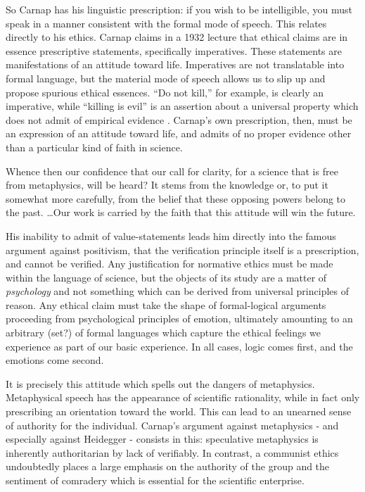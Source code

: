 \documentclass[leqno, 12pt]{turabian-researchpaper}
\begin{document}
	So Carnap has his linguistic prescription: if you wish to be intelligible, you
	must speak in a manner consistent with the formal mode of speech. This relates
	directly to his ethics. Carnap claims in a 1932 lecture that ethical claims
	are in essence prescriptive statements, specifically imperatives. These
	statements are manifestations of an attitude toward life. Imperatives are not translatable
	into formal language, but the material mode of speech allows us to slip up and
	propose spurious ethical essences. \enquote{Do not kill,} for example, is clearly
	an imperative, while \enquote{killing is evil} is an assertion about a universal
	property which does not admit of empirical evidence \autocite[\S1.4]{carnap1996}.
	Carnap's own prescription, then, must be an expression of an attitude toward life,
	and admits of no proper evidence other than a particular kind of faith in
	science.

	\begin{displayquote}
		 Whence then our confidence that our call for
		clarity, for a science that is free from metaphysics, will be heard? It
		stems from the knowledge or, to put it somewhat more carefully, from the
		belief that these opposing powers belong to the past. \dots Our work is carried
		by the faith that this attitude will win the future.
	\end{displayquote}

	His inability to admit of value-statements leads him directly into the famous argument
	against positivism, that the verification principle itself is a prescription, and
	cannot be verified. Any justification for normative ethics must be made within
	the language of science, but the objects of its study are a matter of \emph{psychology}
	and not something which can be derived from universal principles of reason. Any
	ethical claim must take the shape of formal-logical arguments proceeding from psychological
	principles of emotion, ultimately amounting to an arbitrary (set?) of formal languages
	which capture the ethical feelings we experience as part of our basic experience.
	In all cases, logic comes first, and the emotions come second.

	It is precisely this attitude which spells out the dangers of metaphysics. Metaphysical
	speech has the appearance of scientific rationality, while in fact only
	prescribing an orientation toward the world. This can lead to an unearned sense
	of authority for the individual. Carnap's argument against metaphysics - and
	especially against Heidegger - consists in this: speculative metaphysics is inherently
	authoritarian by lack of verifiably. In contrast, a communist ethics undoubtedly
	places a large emphasis on the authority of the group and the sentiment of comradery
	which is essential for the scientific enterprise.
\end{document}
